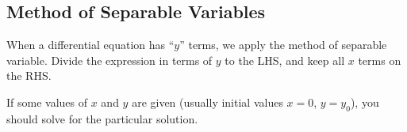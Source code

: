 \subsection{Method of Separable Variables}
When a differential equation has ``$y$'' terms, we apply the method of separable variable. Divide the expression in terms of $y$ to the LHS, and keep all $x$ terms on the RHS.
\begin{center}\end{center}
{}
\begin{info}[title=Note]
If some values of $x$ and $y$ are given (usually initial values $x=0$, $y=y_{0}$), you should solve for the particular solution.
\end{info}
